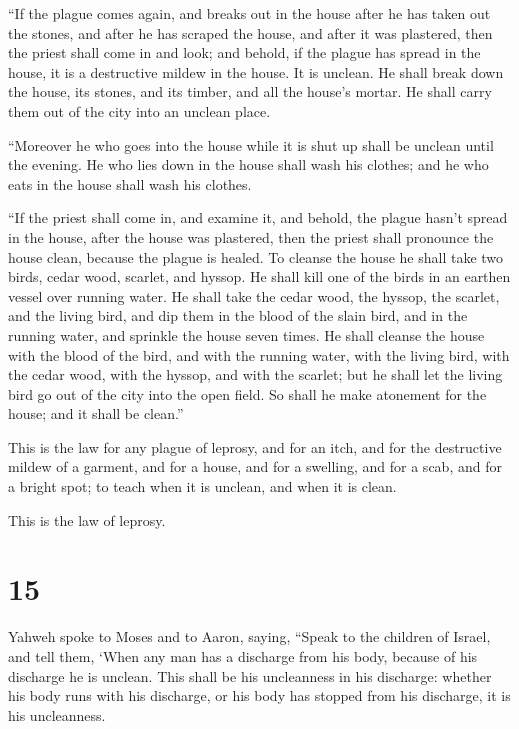  ``If the plague comes again, and breaks out in the house
after he has taken out the stones, and after he has scraped the house,
and after it was plastered,  then the priest shall come in
and look; and behold, if the plague has spread in the house, it is a
destructive mildew in the house. It is unclean.  He shall
break down the house, its stones, and its timber, and all the house's
mortar. He shall carry them out of the city into an unclean place.

 ``Moreover he who goes into the house while it is shut up
shall be unclean until the evening.  He who lies down in
the house shall wash his clothes; and he who eats in the house shall
wash his clothes.

 ``If the priest shall come in, and examine it, and behold,
the plague hasn't spread in the house, after the house was plastered,
then the priest shall pronounce the house clean, because the plague is
healed.  To cleanse the house he shall take two birds,
cedar wood, scarlet, and hyssop.  He shall kill one of the
birds in an earthen vessel over running water.  He shall
take the cedar wood, the hyssop, the scarlet, and the living bird, and
dip them in the blood of the slain bird, and in the running water, and
sprinkle the house seven times.  He shall cleanse the house
with the blood of the bird, and with the running water, with the living
bird, with the cedar wood, with the hyssop, and with the scarlet;
 but he shall let the living bird go out of the city into
the open field. So shall he make atonement for the house; and it shall
be clean.''

 This is the law for any plague of leprosy, and for an
itch,  and for the destructive mildew of a garment, and for
a house,  and for a swelling, and for a scab, and for a
bright spot;  to teach when it is unclean, and when it is
clean.

This is the law of leprosy.

\hypertarget{section-14}{%
\section{15}\label{section-14}}

 Yahweh spoke to Moses and to Aaron, saying, 
``Speak to the children of Israel, and tell them, `When any man has a
discharge from his body, because of his discharge he is unclean.
 This shall be his uncleanness in his discharge: whether his
body runs with his discharge, or his body has stopped from his
discharge, it is his uncleanness.

